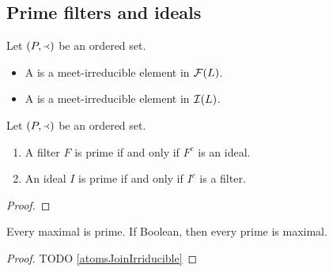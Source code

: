 \subsection{Prime filters and ideals}
\begin{definition}
Let $\sSet{P,\Yleft}$ be an ordered set.
\begin{itemize}
\item A  is a meet-irreducible element in $\operatorname{\mathcal{F}}(L)$.
\item A  is a meet-irreducible element in $\operatorname{\mathcal{I}}(L)$.
\end{itemize}
\end{definition}

\begin{proposition}
Let $\sSet{P,\Yleft}$ be an ordered set.
\begin{enumerate}
\item A filter $F$ is prime \textup{if and only if} $F^c$ is an ideal.
\item An ideal $I$ is prime \textup{if and only if} $I^c$ is a filter.
\end{enumerate}
\end{proposition}
\begin{proof}

\end{proof}

\begin{lemma} \label{maximalPrimeFiltersIdeals}
Every maximal is prime. If Boolean, then every prime is maximal.
\end{lemma}
\begin{proof}
TODO \ref{atomsJoinIrriducible}
\end{proof}


